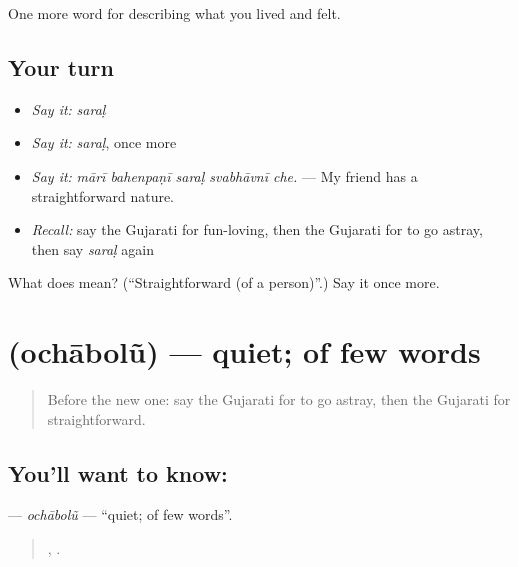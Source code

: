\begin{grammarlens}[title={What you've built}]
One more word for describing what you lived and felt.
\end{grammarlens}

\subsection*{Your turn}
\begin{itemize}
\raggedright
  \item \emph{Say it:} \emph{saraḷ}
  \item \emph{Say it:} \emph{saraḷ}, once more
  \item \emph{Say it:} \emph{mārī bahenpaṇī saraḷ svabhāvnī che.} — My friend has a straightforward nature.
  \item \emph{Recall:} say the Gujarati for fun-loving, then the Gujarati for to go astray, then say \emph{saraḷ} again
\end{itemize}

\begin{tcolorbox}[breakable,colback=teal!4,colframe=teal!35!black,title={Before you move on}]
What does  mean? (\textquotedblleft{}Straightforward (of a person)\textquotedblright{}.) Say it once more.
\end{tcolorbox}
\section[\texorpdfstring{\gu{ઓછાબોલું} (ochābolũ)}{ઓછાબોલું (ochābolũ)}]{ (ochābolũ) — quiet; of few words}

\label{lesson:GU-C463-ochabolu}



\begin{quote}
Before the new one: say the Gujarati for to go astray, then the Gujarati for straightforward.
\end{quote}

\subsection*{You'll want to know: }
\textbf{} — \emph{ochābolũ} — \textquotedblleft{}quiet; of few words\textquotedblright{}.

\begin{quote}
  ,    .
\end{quote}

